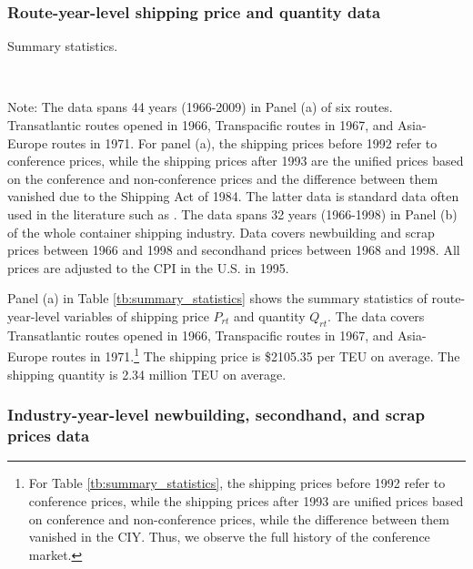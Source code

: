 \documentclass[11pt]{article}
\begin{document}
\subsubsection{Route-year-level shipping price and quantity data}

\begin{table}[!htbp]
  \begin{center}
      \caption{Summary statistics.}
      \label{tb:summary_statistics} 
      \\
  \end{center}\footnotesize
  Note: The data spans 44 years (1966-2009) in Panel (a) of six routes. Transatlantic routes opened in 1966, Transpacific routes in 1967, and Asia-Europe routes in 1971. For panel (a), the shipping prices before 1992 refer to conference prices, while the shipping prices after 1993 are the unified prices based on the conference and non-conference prices and the difference between them vanished due to the Shipping Act of 1984. The latter data is standard data often used in the literature such as \cite{jeon2022learning}. The data spans 32 years (1966-1998) in Panel (b) of the whole container shipping industry. Data covers newbuilding and scrap prices between 1966 and 1998 and secondhand prices between 1968 and 1998. All prices are adjusted to the CPI in the U.S. in 1995. 
\end{table} 

Panel (a) in Table \ref{tb:summary_statistics} shows the summary statistics of route-year-level variables of shipping price $P_{rt}$ and quantity $Q_{rt}$. The data covers Transatlantic routes opened in 1966, Transpacific routes in 1967, and Asia-Europe routes in 1971.\footnote{For Table \ref{tb:summary_statistics}, the shipping prices before 1992 refer to conference prices, while the shipping prices after 1993 are unified prices based on conference and non-conference prices, while the difference between them vanished in the CIY. Thus, we observe the full history of the conference market.} The shipping price is \$2105.35 per TEU on average. The shipping quantity is 2.34 million TEU on average. 

\subsubsection{Industry-year-level newbuilding, secondhand, and scrap prices data}
\end{document}
